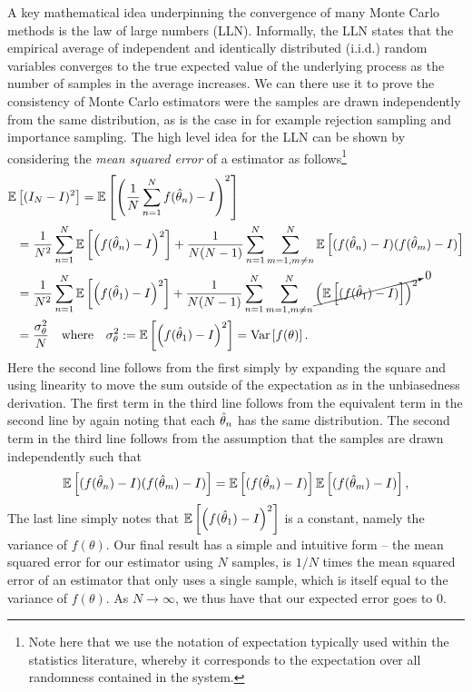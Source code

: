 A key mathematical idea underpinning the convergence of many Monte Carlo methods is the 
law of large numbers (LLN).  Informally, the LLN states that the empirical average of 
independent and identically distributed (i.i.d.)  random variables converges to 
the true expected value of the underlying process as the number of samples in the
average increases.  We can there use it to prove the consistency of Monte Carlo estimators
were the samples are drawn independently from the same distribution, as is the case
in for example rejection sampling and importance sampling.  The high level idea for the LLN can be shown by
considering the  \emph{mean squared error} of a \mc estimator as 
follows\footnote{Note here that we use the notation of expectation typically used within the statistics literature,
whereby it corresponds to the expectation over all randomness contained in the system.}
\begin{align}
\mathbb{E} &\left[(I_N-I)^2\right] = \mathbb{E}\left[\left(\frac{1}{N}\sum_{n=1}^{N}f(\hat{\theta}_n) - I\right)^2\right] \nonumber \\
&= \frac{1}{N^2}\sum_{n=1}^{N} \mathbb{E}\left[ \left(f(\hat{\theta}_n)-I\right)^2\right] + 
\frac{1}{N(N-1)}\sum_{n=1}^{N}\sum_{m=1,m\neq n}^{N} \mathbb{E}\left[ (f(\hat{\theta}_n)-I)(f(\hat{\theta}_m)-I)\right] \nonumber \\
&= \frac{1}{N^2}\sum_{n=1}^{N} \mathbb{E}\left[ \left(f(\hat{\theta}_1)-I\right)^2\right] + 
\frac{1}{N(N-1)}\sum_{n=1}^{N}\sum_{m=1,m\neq n}^{N} \cancelto{0}{\left(\mathbb{E}\left[(f(\hat{\theta}_1)-I)\right]\right)^2} \nonumber \\
&= \frac{\sigma_{\theta}^2}{N}  \quad \text{where} \quad \sigma_{\theta}^2 := \mathbb{E}\left[ \left(f(\hat{\theta}_1)-I\right)^2\right]
= \operatorname*{Var} \left[f(\theta)\right].
\end{align}
Here the second line follows from the first simply by expanding the square and using linearity
to move the sum outside of the expectation as in the unbiasedness derivation.
The first term in the third line follows from the equivalent term in the second line by again noting that
each $\hat{\theta}_n$ has the same distribution.  The second term in the third line
follows from the assumption that the samples are drawn independently such that
\[
\mathbb{E}\left[ (f(\hat{\theta}_n)-I)(f(\hat{\theta}_m)-I)\right] = \mathbb{E}\left[ (f(\hat{\theta}_n)-I)\right] \mathbb{E}\left[(f(\hat{\theta}_m)-I)\right],
\]
The last line simply notes that $\mathbb{E}\left[ \left(f(\hat{\theta}_1)-I\right)^2\right]$ is a constant,
namely the variance of $f(\theta)$.
  Our final result has a simple and intuitive form -- the mean squared error for
our estimator using $N$ samples, is $1/N$ times the mean squared error of an estimator that only uses
a single sample, which is itself equal to the variance of $f(\theta)$.  As $N\rightarrow\infty$, we thus
have that our expected error goes to $0$.

